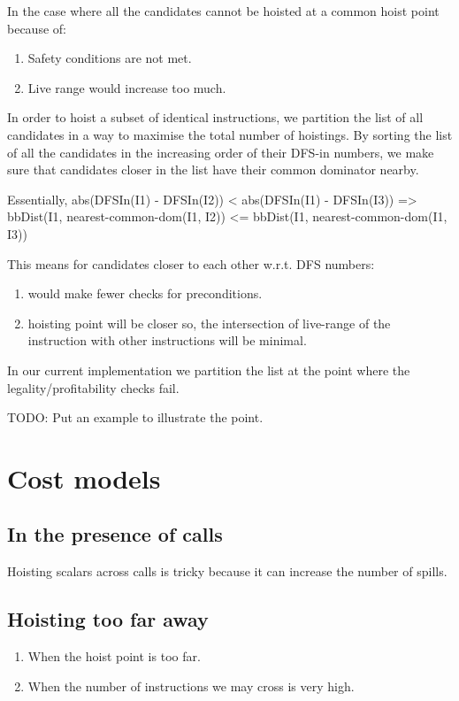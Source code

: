 \documentclass{sig-alternate}
\begin{document}
In the case where all the candidates cannot be hoisted at a common
hoist point because of:
\begin{enumerate}
\item Safety conditions are not met.
\item Live range would increase too much.
\end{enumerate}

In order to hoist a subset of identical instructions, we partition the
list of all candidates in a way to maximise the total number of
hoistings.  By sorting the list of all the candidates in the
increasing order of their DFS-in numbers, we make sure that candidates
closer in the list have their common dominator nearby.

Essentially,
abs(DFSIn(I1) - DFSIn(I2)) < abs(DFSIn(I1) - DFSIn(I3))
=> bbDist(I1, nearest-common-dom(I1, I2)) <= bbDist(I1, nearest-common-dom(I1, I3))

This means for candidates closer to each other w.r.t. DFS numbers:
\begin{enumerate}
\item would make fewer checks for preconditions.
\item hoisting point will be closer so, the intersection of live-range of the instruction
with other instructions will be minimal.
\end{enumerate}

In our current implementation we partition the list at the point where the
legality/profitability checks fail.

TODO: Put an example to illustrate the point.

\section{Cost models}
\subsection{In the presence of calls}
Hoisting scalars across calls is tricky because it can increase the
number of spills.

\subsection{Hoisting too far away}
\begin{enumerate}
\item When the hoist point is too far.
\item When the number of instructions we may cross is very high.
\end{enumerate}
\end{document}

